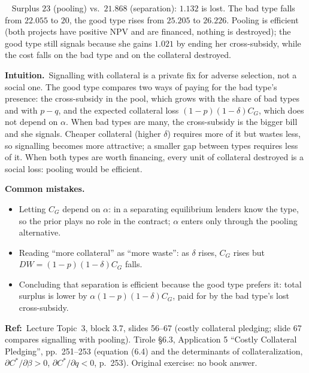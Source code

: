 \documentclass[11pt,a4paper]{article}
\newcommand{\intuition}{\par\medskip\noindent\textbf{Intuition.}~}
\newcommand{\refbib}{\par\smallskip\noindent\textbf{Ref:}~}
\newcommand{\answer}[1]{\par\smallskip\noindent\fbox{\textbf{Answer #1.}}~}
\newcommand{\pitfalls}{\par\medskip\noindent\textbf{Common mistakes.}}
\begin{document}
\answer{(f)} Surplus $23$ (pooling) vs.\ $21.868$ (separation): $1.132$ is lost. The bad type falls from $22.055$ to $20$, the good type rises from $25.205$ to $26.226$. Pooling is efficient (both projects have positive NPV and are financed, nothing is destroyed); the good type still signals because she gains $1.021$ by ending her cross-subsidy, while the cost falls on the bad type and on the collateral destroyed.

\intuition Signalling with collateral is a private fix for adverse selection, not a social one. The good type compares two ways of paying for the bad type's presence: the cross-subsidy in the pool, which grows with the share of bad types and with $p-q$, and the expected collateral loss $(1-p)(1-\delta)C_G$, which does not depend on $\alpha$. When bad types are many, the cross-subsidy is the bigger bill and she signals. Cheaper collateral (higher $\delta$) requires more of it but wastes less, so signalling becomes more attractive; a smaller gap between types requires less of it. When both types are worth financing, every unit of collateral destroyed is a social loss: pooling would be efficient.

\pitfalls
\begin{itemize}
  \item Letting $C_G$ depend on $\alpha$: in a separating equilibrium lenders know the type, so the prior plays no role in the contract; $\alpha$ enters only through the pooling alternative.
  \item Reading ``more collateral'' as ``more waste'': as $\delta$ rises, $C_G$ rises but $DW=(1-p)(1-\delta)C_G$ falls.
  \item Concluding that separation is efficient because the good type prefers it: total surplus is lower by $\alpha(1-p)(1-\delta)C_G$, paid for by the bad type's lost cross-subsidy.
\end{itemize}

\refbib{Lecture Topic~3, block 3.7, slides 56--67 (costly collateral pledging; slide 67 compares signalling with pooling). Tirole \S6.3, Application 5 ``Costly Collateral Pledging'', pp.~251--253 (equation (6.4) and the determinants of collateralization, $\partial C^*/\partial\beta>0$, $\partial C^*/\partial q<0$, p.~253). Original exercise: no book answer.}
\end{document}
